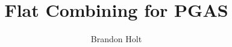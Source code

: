 
\usepackage{microtype}


\title{\Large Flat Combining for PGAS}


\author{Brandon Holt}


\maketitle
\begin{abstract}

\end{abstract}












